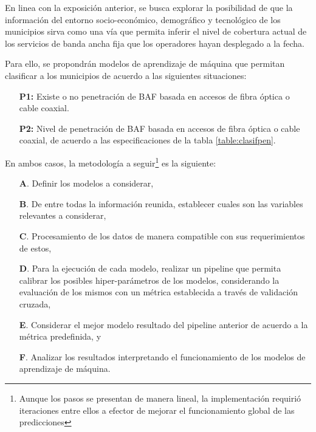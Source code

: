 \documentclass[9pt,twocolumn,twoside]{ilcss}
\begin{document}
En linea con la exposición anterior, se busca explorar la posibilidad de que la información del entorno socio-económico, demográfico y tecnológico de los municipios sirva como una vía que permita inferir el nivel de cobertura actual de los servicios de banda ancha fija que los operadores hayan desplegado a la fecha.

Para ello, se propondrán modelos de aprendizaje de máquina que permitan clasificar a los municipios de acuerdo a las siguientes situaciones:

\begin{itemize}
	\item[\textbf{P1:}] Existe o no penetración de BAF basada en accesos de fibra óptica o cable coaxial. \vspace{-0.3cm}
	\item[\textbf{P2:}] Nivel de penetración de BAF basada en accesos de fibra óptica o cable coaxial, de acuerdo a las especificaciones de la tabla \ref{table:clasifpen}.
\end{itemize}

En ambos casos, la metodología a seguir\footnote{Aunque los pasos se presentan de manera lineal, la implementación requirió iteraciones entre ellos a efector de mejorar el funcionamiento global de las predicciones} es la siguiente:

\begin{itemize}
	\item[\textbf{A}.] Definir los modelos a considerar, \vspace{-0.3cm}
	\item[\textbf{B}.] De entre todas la información reunida, establecer cuales son las variables relevantes a considerar,\vspace{-0.3cm}
	\item[\textbf{C}.] Procesamiento de los datos de manera compatible con sus requerimientos de estos,\vspace{-0.3cm}
	\item[\textbf{D}.] Para la ejecución de cada modelo, realizar un pipeline que permita calibrar los posibles hiper-parámetros de los modelos, considerando la evaluación de los mismos con un métrica establecida a través de validación cruzada,\vspace{-0.3cm}
	\item[\textbf{E}.] Considerar el mejor modelo resultado del pipeline anterior de acuerdo a la métrica predefinida, y\vspace{-0.3cm}
	\item[\textbf{F}.] Analizar los resultados interpretando el funcionamiento de los modelos de aprendizaje de máquina.	
\end{itemize}
\end{document}
